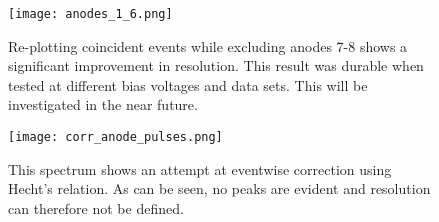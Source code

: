 \begin{figure}[h!]
\begin{center}
\texttt{[image: anodes\_1\_6.png]}
\caption{Re-plotting coincident events while excluding anodes 7-8 shows a significant improvement in resolution. This result was durable when tested at different bias voltages and data sets. This will be investigated in the near future.}
\label{400}
\end{center}
\end{figure}

\begin{figure}[h!]
\begin{center}
\texttt{[image: corr\_anode\_pulses.png]}
\caption{This spectrum shows an attempt at eventwise correction using Hecht's relation. As can be seen, no peaks are evident and resolution can therefore not be defined.}
\label{400}
\end{center}
\end{figure}




